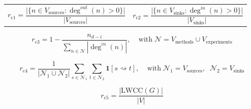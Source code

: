 \documentclass{article}
\begin{document}
{\renewcommand{\arraystretch}{0}%
\begin{table}[!h]
    \centering
    \begin{tabularx}{1.014\textwidth}{XX}

\begin{equation} \label{eq:rsrc}  
    r_{\mathrm{c1}} = \frac{\bigl|\{n\in V_{\text{sources}}:\deg^{out}(n)>0\}\bigr|}{|V_{\text{sources}}|} 
\end{equation} 

&

\begin{equation} \label{eq:rsink}
    r_{\mathrm{c2}} = \frac{\bigl|\{n\in V_{\text{sinks}}:\deg^{in}(n)>0\}\bigr|}{|V_{\text{sinks}}|} 
\end{equation}

    \end{tabularx}
\end{table}
}

\begin{equation} \label{eq:rin}
    r_{\mathrm{c3}} = 1 - \frac{n_{d-i}}{\sum_{n\in \mathcal{N} }|\deg^{in}(n)|}, \;\;\;\; \text{with} \; \mathcal{N}=V_{\text{methods}} \cup V_{\text{experiments}} 
\end{equation}

\begin{equation} \label{eq:rreach}
    r_{\mathrm{c4}} = \frac{1}{|\mathcal{N}_1 \cup \mathcal{N}_2|}\sum_{s\in \mathcal{N}_1}\sum_{t\in \mathcal{N}_2}\mathbf{1}[s\rightsquigarrow t] , \;\;\;\; \text{with} \; \mathcal{N}_1=V_{\text{sources}}, \;\; \mathcal{N}_2=V_{\text{sinks}} 
\end{equation} 

\begin{equation}  \label{eq:rlwcc} 
    r_{\mathrm{c5}} = \frac{|\mathrm{LWCC}(G)|}{|V|} 
\end{equation} 
\end{document}
